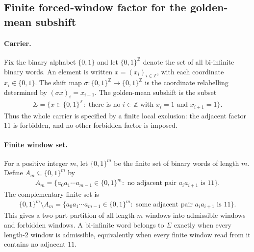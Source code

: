 \subsection{Finite forced-window factor for the golden-mean subshift}
\label{sec:phi-m-factor-golden-mean-subshift}

\paragraph{Carrier.}
Fix the binary alphabet $\{0,1\}$ and let $\{0,1\}^{\mathbb Z}$ denote the set of all bi-infinite binary words. An element is written $x=(x_i)_{i\in\mathbb Z}$, with each coordinate $x_i\in\{0,1\}$. The shift map $\sigma:\{0,1\}^{\mathbb Z}\to\{0,1\}^{\mathbb Z}$ is the coordinate relabelling determined by $(\sigma x)_i=x_{i+1}$. The golden-mean subshift is the subset
$$
\begin{aligned}
\Sigma=\{x\in\{0,1\}^{\mathbb Z}:\text{ there is no }i\in\mathbb Z\text{ with }x_i=1\text{ and }x_{i+1}=1\}.
\end{aligned}
$$
Thus the whole carrier is specified by a finite local exclusion: the adjacent factor $11$ is forbidden, and no other forbidden factor is imposed.

\paragraph{Finite window set.}
For a positive integer $m$, let $\{0,1\}^m$ be the finite set of binary words of length $m$. Define $A_m\subseteq\{0,1\}^m$ by
$$
\begin{aligned}
A_m=\{a_0a_1\cdots a_{m-1}\in\{0,1\}^m:\text{ no adjacent pair }a_i a_{i+1}\text{ is }11\}.
\end{aligned}
$$
The complementary finite set is
$$
\begin{aligned}
\{0,1\}^m\setminus A_m=\{a_0a_1\cdots a_{m-1}\in\{0,1\}^m:\text{ some adjacent pair }a_i a_{i+1}\text{ is }11\}.
\end{aligned}
$$
This gives a two-part partition of all length-$m$ windows into admissible windows and forbidden windows. A bi-infinite word belongs to $\Sigma$ exactly when every length-$2$ window is admissible, equivalently when every finite window read from it contains no adjacent $11$.

